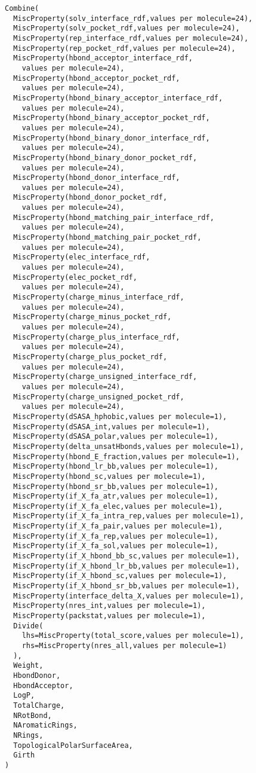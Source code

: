 \begin{verbatim}
Combine(
  MiscProperty(solv_interface_rdf,values per molecule=24),
  MiscProperty(solv_pocket_rdf,values per molecule=24),
  MiscProperty(rep_interface_rdf,values per molecule=24),
  MiscProperty(rep_pocket_rdf,values per molecule=24),
  MiscProperty(hbond_acceptor_interface_rdf,
    values per molecule=24),
  MiscProperty(hbond_acceptor_pocket_rdf,
    values per molecule=24),
  MiscProperty(hbond_binary_acceptor_interface_rdf,
    values per molecule=24),
  MiscProperty(hbond_binary_acceptor_pocket_rdf,
    values per molecule=24),
  MiscProperty(hbond_binary_donor_interface_rdf,
    values per molecule=24),
  MiscProperty(hbond_binary_donor_pocket_rdf,
    values per molecule=24),
  MiscProperty(hbond_donor_interface_rdf,
    values per molecule=24),
  MiscProperty(hbond_donor_pocket_rdf,
    values per molecule=24),
  MiscProperty(hbond_matching_pair_interface_rdf,
    values per molecule=24),
  MiscProperty(hbond_matching_pair_pocket_rdf,
    values per molecule=24),
  MiscProperty(elec_interface_rdf,
    values per molecule=24),
  MiscProperty(elec_pocket_rdf,
    values per molecule=24),
  MiscProperty(charge_minus_interface_rdf,
    values per molecule=24),
  MiscProperty(charge_minus_pocket_rdf,
    values per molecule=24),
  MiscProperty(charge_plus_interface_rdf,
    values per molecule=24),
  MiscProperty(charge_plus_pocket_rdf,
    values per molecule=24),
  MiscProperty(charge_unsigned_interface_rdf,
    values per molecule=24),
  MiscProperty(charge_unsigned_pocket_rdf,
    values per molecule=24),
  MiscProperty(dSASA_hphobic,values per molecule=1),
  MiscProperty(dSASA_int,values per molecule=1),
  MiscProperty(dSASA_polar,values per molecule=1),
  MiscProperty(delta_unsatHbonds,values per molecule=1),
  MiscProperty(hbond_E_fraction,values per molecule=1),
  MiscProperty(hbond_lr_bb,values per molecule=1),
  MiscProperty(hbond_sc,values per molecule=1),
  MiscProperty(hbond_sr_bb,values per molecule=1),
  MiscProperty(if_X_fa_atr,values per molecule=1),
  MiscProperty(if_X_fa_elec,values per molecule=1),
  MiscProperty(if_X_fa_intra_rep,values per molecule=1),
  MiscProperty(if_X_fa_pair,values per molecule=1),
  MiscProperty(if_X_fa_rep,values per molecule=1),
  MiscProperty(if_X_fa_sol,values per molecule=1),
  MiscProperty(if_X_hbond_bb_sc,values per molecule=1),
  MiscProperty(if_X_hbond_lr_bb,values per molecule=1),
  MiscProperty(if_X_hbond_sc,values per molecule=1),
  MiscProperty(if_X_hbond_sr_bb,values per molecule=1),
  MiscProperty(interface_delta_X,values per molecule=1),
  MiscProperty(nres_int,values per molecule=1),
  MiscProperty(packstat,values per molecule=1),
  Divide(
    lhs=MiscProperty(total_score,values per molecule=1),
    rhs=MiscProperty(nres_all,values per molecule=1)
  ),
  Weight,
  HbondDonor,
  HbondAcceptor,
  LogP,
  TotalCharge,
  NRotBond,
  NAromaticRings,
  NRings,
  TopologicalPolarSurfaceArea,
  Girth
)
\end{verbatim}
\doublespace


